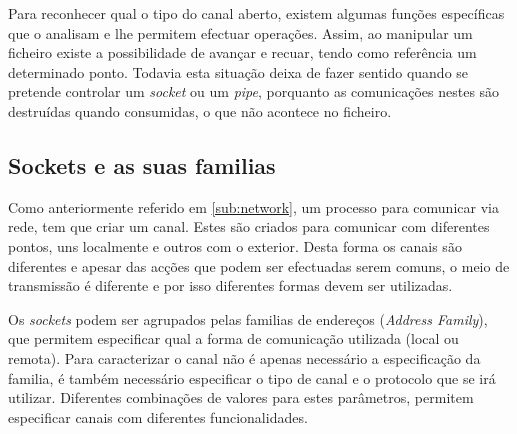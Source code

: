 
Para reconhecer qual o tipo do canal aberto, existem algumas funções específicas que o analisam e lhe permitem efectuar operações.
Assim, ao manipular um ficheiro existe a possibilidade de avançar e recuar, tendo como referência um determinado ponto.
Todavia esta situação deixa de fazer sentido quando se pretende controlar um \textit{socket} ou um \textit{pipe}, porquanto as comunicações nestes são destruídas quando consumidas, o que não acontece no ficheiro.
 




\subsection{Sockets e as suas familias}
\label{sub:sockets}

Como anteriormente referido em \ref{sub:network}, um processo para comunicar via rede, tem que criar um canal.
Estes são criados para comunicar com diferentes pontos, uns localmente e outros com o exterior.
Desta forma os canais são diferentes e apesar das acções que podem ser efectuadas serem comuns, o meio de transmissão é diferente e por isso diferentes formas devem ser utilizadas.

Os \textit{sockets} podem ser agrupados pelas familias de endereços (\textit{Address Family}), que permitem especificar qual a forma de comunicação utilizada (local ou remota).
Para caracterizar o canal não é apenas necessário a especificação da familia, é também necessário especificar o tipo de canal e o protocolo que se irá utilizar.
Diferentes combinações de valores para estes parâmetros, permitem especificar canais com diferentes funcionalidades.

